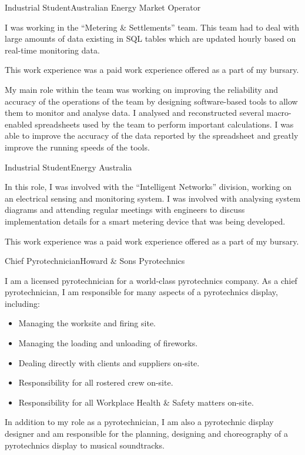 \begin{professionalExperience}
{    %
}

{Industrial Student}{Australian Energy Market Operator}
{I was working in the ``Metering \& Settlements'' team. This team had to deal
with large amounts of data existing in SQL tables which are updated hourly based
on real-time monitoring data.

This work experience was a paid work experience offered as a part of my
 bursary.

My main role within the team was working on improving the reliability and
accuracy of the operations of the team by designing software-based tools to
allow them to monitor and analyse data. I analysed and reconstructed several
macro-enabled spreadsheets used by the team to perform important calculations. I
was able to improve the accuracy of the data reported by the spreadsheet and
greatly improve the running speeds of the tools.}
{

}

{Industrial Student}{Energy Australia}
{In this role, I was involved with the ``Intelligent Networks'' division,
working on an electrical sensing and monitoring system. I was involved with
analysing system diagrams and attending regular meetings with engineers to
discuss implementation details for a smart metering device that was being
developed.

This work experience was a paid work experience offered as a part of my
 bursary.}
{}

{Chief Pyrotechnician}{Howard \& Sons Pyrotechnics}
{I am a licensed pyrotechnician for a world-class pyrotechnics company. As a
chief pyrotechnician, I am responsible for many aspects of a pyrotechnics
display, including:
\begin{itemize}
    \item Managing the worksite and firing site.
    \item Managing the loading and unloading of fireworks.
    \item Dealing directly with clients and suppliers on-site.
    \item Responsibility for all rostered crew on-site.
    \item Responsibility for all Workplace Health \& Safety matters on-site.
\end{itemize}

In addition to my role as a pyrotechnician, I am also a pyrotechnic display
designer and am responsible for the planning, designing and choreography of a
pyrotechnics display to musical soundtracks.}
{}

\end{professionalExperience}
